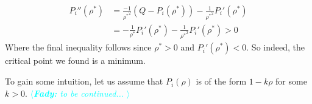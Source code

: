 \documentclass{article}
\newcommand{\fady}[1]{\textcolor{cyan}{$\langle${\slshape{\bfseries Fady:} #1 }$\rangle$}}
\begin{document}
\begin{align}
    P_i''(\rho^*) &= \frac{-1}{{\rho^*}^2}(Q-P_i(\rho^*)) -\frac{1}{{\rho^*}^2}P_i'(\rho^*) \\
    &= -\frac{1}{{\rho^*}}P_i'(\rho^*) -\frac{1}{{\rho^*}^2}P_i'(\rho^*) > 0
\end{align}
Where the final inequality follows since $\rho^* > 0$ and $P_i'(\rho^*) < 0$. So indeed, the critical point we found is a minimum. 

To gain some intuition, let us assume that $P_i(\rho)$ is of the form $1-k\rho$ for some $k > 0$. \fady{to be continued...}
\end{document}
